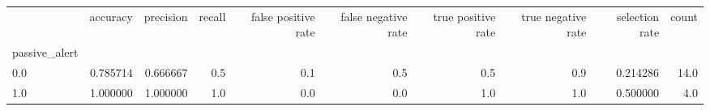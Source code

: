 \begin{tabular}{lrrrrrrrrr}
\toprule
{} &  accuracy &  precision &  recall &  false positive rate &  false negative rate &  true positive rate &  true negative rate &  selection rate &  count \\
passive\_alert &           &            &         &                      &                      &                     &                     &                 &        \\
\midrule
0.0           &  0.785714 &   0.666667 &     0.5 &                  0.1 &                  0.5 &                 0.5 &                 0.9 &        0.214286 &   14.0 \\
1.0           &  1.000000 &   1.000000 &     1.0 &                  0.0 &                  0.0 &                 1.0 &                 1.0 &        0.500000 &    4.0 \\
\bottomrule
\end{tabular}
